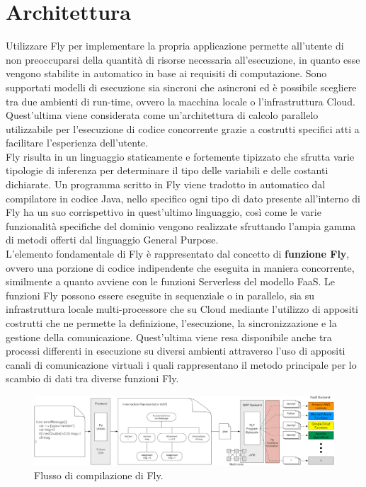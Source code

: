 \section{Architettura}
Utilizzare Fly per implementare la propria applicazione permette all'utente di non preoccuparsi della quantità di risorse necessaria all'esecuzione, in quanto esse vengono stabilite in automatico in base ai requisiti di computazione. Sono supportati modelli di esecuzione sia sincroni che asincroni ed è possibile scegliere tra due ambienti di run-time, ovvero la macchina locale o l'infrastruttura Cloud. Quest'ultima viene considerata come un'architettura di calcolo parallelo utilizzabile per l'esecuzione di codice concorrente grazie a costrutti specifici atti a facilitare l'esperienza dell'utente. \\
Fly risulta in un linguaggio staticamente e fortemente tipizzato che sfrutta varie tipologie di inferenza per determinare il tipo delle variabili e delle costanti dichiarate. Un programma scritto in Fly viene tradotto in automatico dal compilatore in codice Java, nello specifico ogni tipo di dato presente all'interno di Fly ha un suo corrispettivo in quest'ultimo linguaggio, così come le varie funzionalità specifiche del dominio vengono realizzate sfruttando l'ampia gamma di metodi offerti dal linguaggio General Purpose. \\
L’elemento fondamentale di Fly è rappresentato dal concetto di \textbf{funzione Fly}, ovvero una porzione di codice indipendente che eseguita in maniera concorrente, similmente a quanto avviene con le funzioni Serverless del modello FaaS. Le funzioni Fly possono essere eseguite in sequenziale o in parallelo, sia su infrastruttura locale multi-processore che su Cloud mediante l'utilizzo di appositi costrutti che ne permette la definizione, l'esecuzione, la sincronizzazione e la gestione della comunicazione. Quest’ultima viene resa disponibile anche tra processi differenti in esecuzione su diversi ambienti attraverso l'uso di appositi canali di comunicazione virtuali i quali rappresentano il metodo principale per lo scambio di dati tra diverse funzioni Fly. \\ 

\begin{figure}[htbp]
 \centering
 \includegraphics[scale=0.7]{./Figure/FLYCompilazione.png}
 \caption{Flusso di compilazione di Fly.}
 \label{fig:compilazione}
\end{figure}

